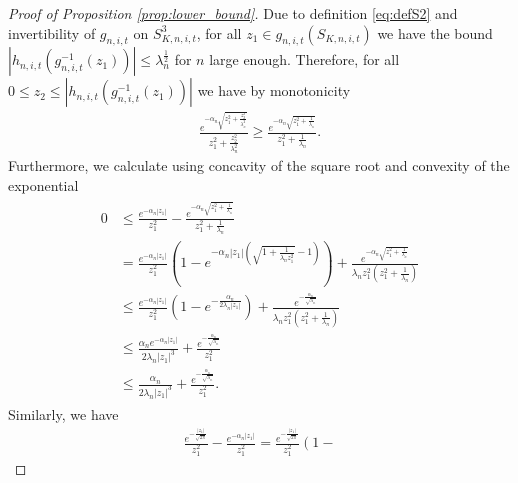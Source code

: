 \documentclass[11pt]{article}
\numberwithin{statement}{section}
\numberwithin{equation}{section}
\theoremstyle{remark}
\begin{document}
\begin{proof}[Proof of Proposition \ref{prop:lower_bound}]
	 Due to definition \eqref{eq:defS2} and invertibility of
         $g_{n,i,t}$ on $S^3_{K,n,i,t}$, for all
         $z_1 \in g_{n,i,t}\left( S_{K,n,i,t}\right)$ we have the
         bound
         $|h_{n,i,t}(g_{n,i,t}^{-1}(z_1))| \leq
         \lambda_n^{\frac{1}{2}}$ for $n$ large enough. Therefore, for all
         $0 \leq z_2 \leq |h_{n,i,t}(g_{n,i,t}^{-1}(z_1))|$ we have by
         monotonicity
	\begin{align}\label{eq:kernel_below}
          \frac{e^{-\alpha_n\sqrt{z_1^2 + \frac{z_2^2}{\lambda_n^2}
          }}}{z_1^2 + \frac{z_2^2}{\lambda_n^2}} \geq
          \frac{e^{-\alpha_n \sqrt{z_1^2 + \frac{1}{\lambda_n}
          }}}{z_1^2 + \frac{1}{\lambda_n}}. 
	\end{align}
	Furthermore, we calculate using concavity of the square root
        and convexity of the exponential
	\begin{align}
          \label{eq:ker1}
	  \begin{split}
            0 & \leq \frac{e^{-\alpha_n |z_1|}}{z_1^2} -
            \frac{e^{-\alpha_n \sqrt{z_1^2 + \frac{1}{\lambda_n}
                }}}{z_1^2 + \frac{1}{\lambda_n}} \\
            & = \frac{e^{-\alpha_n |z_1|} }{z_1^2} \left(1 -
              e^{-\alpha_n |z_1| \left( \sqrt{1 + \frac{1}{\lambda_n
                      z_1^2}} - 1 \right)}\right)
            + \frac{ e^{-\alpha_n \sqrt{z_1^2 + \frac{1}{\lambda_n}
                }}}{\lambda_n z_1^2\left(z_1^2 +
                \frac{1}{\lambda_n}\right)}\\ 
            & \leq \frac{e^{-\alpha_n |z_1|} }{z_1^2} \left(1 -
              e^{-\frac{\alpha_n}{2\lambda_n |z_1|}}\right) + \frac{
              e^{-\frac{\alpha_n}{\sqrt{\lambda_n}}}}{\lambda_n
              z_1^2\left(z_1^2 + \frac{1}{\lambda_n}\right)}  \\
            & \leq \frac{\alpha_n e^{-\alpha_n |z_1|} }{2 \lambda_n
              |z_1|^3 }
            + \frac{ e^{-\frac{\alpha_n}{\sqrt{\lambda_n}}}}{ z_1^2} \\
            & \leq \frac{\alpha_n }{2 \lambda_n |z_1|^3 } + \frac{
              e^{-\frac{\alpha_n}{\sqrt{\lambda_n}}}}{ z_1^2}.
            \end{split}
           \end{align}
	Similarly, we have
	\begin{align}
          \label{eq:ker2}
          \frac{e^{- \frac{|z_1|}{\sqrt{2\pi}}}}{z_1^2}  -
          \frac{e^{-\alpha_n |z_1|}}{z_1^2} = \frac{e^{-
          \frac{|z_1|}{\sqrt{2\pi}}}}{z_1^2}  \left( 1 -

\end{align}
\end{proof}
\end{document}

